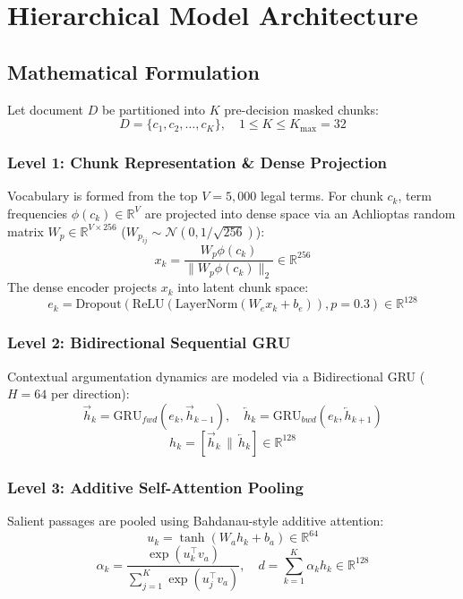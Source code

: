 \documentclass[journal,10pt,twocolumn]{IEEEtran}
\begin{document}
\section{Hierarchical Model Architecture}
\subsection{Mathematical Formulation}
Let document $D$ be partitioned into $K$ pre-decision masked chunks:
\begin{equation}
D = \{c_1, c_2, \dots, c_K\}, \quad 1 \le K \le K_{\max} = 32
\end{equation}

\subsubsection{Level 1: Chunk Representation \& Dense Projection}
Vocabulary is formed from the top $V = 5,000$ legal terms. For chunk $c_k$, term frequencies $\phi(c_k) \in \mathbb{R}^V$ are projected into dense space via an Achlioptas random matrix $W_p \in \mathbb{R}^{V \times 256}$ ($W_{p_{ij}} \sim \mathcal{N}(0, 1/\sqrt{256})$):
\begin{equation}
x_k = \frac{W_p \phi(c_k)}{\|W_p \phi(c_k)\|_2} \in \mathbb{R}^{256}
\end{equation}
The dense encoder projects $x_k$ into latent chunk space:
\begin{equation}
e_k = \text{Dropout}(\text{ReLU}(\text{LayerNorm}(W_e x_k + b_e)), p=0.3) \in \mathbb{R}^{128}
\end{equation}

\subsubsection{Level 2: Bidirectional Sequential GRU}
Contextual argumentation dynamics are modeled via a Bidirectional GRU ($H = 64$ per direction):
\begin{equation}
\vec{h}_k = \text{GRU}_{fwd}(e_k, \vec{h}_{k-1}), \quad \overleftarrow{h}_k = \text{GRU}_{bwd}(e_k, \overleftarrow{h}_{k+1})
\end{equation}
\begin{equation}
h_k = [\vec{h}_k \,\|\, \overleftarrow{h}_k] \in \mathbb{R}^{128}
\end{equation}

\subsubsection{Level 3: Additive Self-Attention Pooling}
Salient passages are pooled using Bahdanau-style additive attention:
\begin{equation}
u_k = \tanh(W_a h_k + b_a) \in \mathbb{R}^{64}
\end{equation}
\begin{equation}
\alpha_k = \frac{\exp(u_k^\top v_a)}{\sum_{j=1}^K \exp(u_j^\top v_a)}, \quad d = \sum_{k=1}^K \alpha_k h_k \in \mathbb{R}^{128}
\end{equation}
\end{document}
